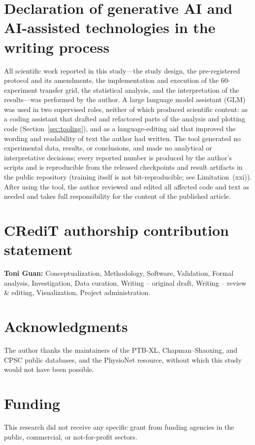 \documentclass[review,12pt,nonatbib]{elsarticle}
\begin{document}
\section*{Declaration of generative AI and AI-assisted technologies in the writing process}
All scientific work reported in this study---the study design, the
pre-registered protocol and its amendments, the implementation and
execution of the 60-experiment transfer grid, the statistical
analysis, and the interpretation of the results---was performed by the
author. A large language model assistant (GLM) was used in two
supervised roles, neither of which produced scientific content: as a
coding assistant that drafted and refactored parts of the analysis and
plotting code (Section~\ref{sec:tooling}), and as a language-editing
aid that improved the wording and readability of text the author had
written. The tool generated no experimental data, results, or
conclusions, and made no analytical or interpretative decisions; every
reported number is produced by the author's scripts and is reproducible
from the released checkpoints and result artifacts in the public
repository (training itself is not bit-reproducible; see
Limitation~(xxi)). After using the tool, the author reviewed
and edited all affected code and text as needed and takes full
responsibility for the content of the published article.

\section*{CRediT authorship contribution statement}
\textbf{Toni Guan:} Conceptualization, Methodology, Software, Validation,
Formal analysis, Investigation, Data curation, Writing -- original draft,
Writing -- review \& editing, Visualization, Project administration.

\section*{Acknowledgments}
The author thanks the maintainers of the PTB-XL, Chapman--Shaoxing,
and CPSC public databases, and the PhysioNet resource, without which
this study would not have been possible.

\section*{Funding}
This research did not receive any specific grant from funding
agencies in the public, commercial, or not-for-profit sectors.
\end{document}
